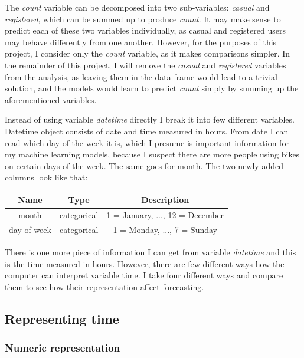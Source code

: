 \documentclass[12pt]{article}
\begin{document}
	The \textit{count} variable can be decomposed into two sub-variables: \textit{casual} and \textit{registered}, which can be summed up to produce \textit{count}. It may make sense to predict each of these two variables individually, as casual and registered users may behave differently from one another. However, for the purposes of this project, I consider only the \textit{count} variable, as it makes comparisons simpler. In the remainder of this project, I will remove the \textit{casual} and \textit{registered} variables from the analysis, as leaving them in the data frame would lead to a trivial solution, and the models would learn to predict \textit{count} simply by summing up the aforementioned variables.
	
	Instead of using variable \textit{datetime} directly I break it into few different variables. Datetime object consists of date and time measured in hours. From date I can read which day of the week it is, which I presume is important information for my machine learning models, because I suspect there are more people using bikes on certain days of the week. The same goes for month. The two newly added columns look like that: 
	
	\begin{center}
		\begin{tabular}{ |c|c|c| } 
			\hline
			\textbf{Name} & \textbf{Type} & \textbf{Description} \\ 
			\hline
			\hline
			month & categorical & 1 = January, ..., 12 = December \\ 
			\hline
			day of week & categorical & 1 = Monday, ..., 7 = Sunday \\
			\hline	
		\end{tabular}
	\end{center}

	There is one more piece of information I can get from variable \textit{datetime} and this is the time measured in hours. However, there are few different ways how the computer can interpret variable time. I take four different ways and compare them to see how their representation affect forecasting. 
	
	\subsection{Representing time}
	
	\subsubsection{Numeric representation}
	
\end{document}
